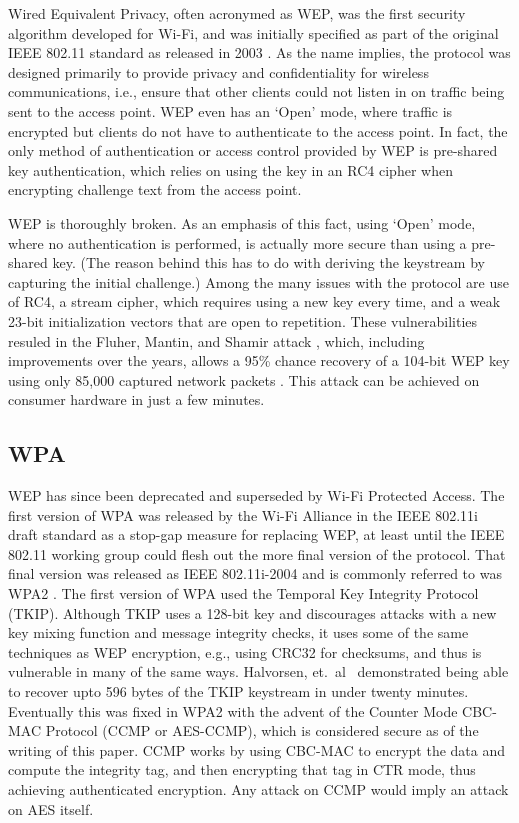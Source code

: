 \documentclass[journal, compsoc]{IEEEtran}
\begin{document}
Wired Equivalent Privacy, often acronymed as WEP, was the first
security algorithm developed for Wi-Fi, and was initially specified as
part of the original IEEE 802.11 standard as released in 2003
\cite{1438730}. As the name implies, the protocol was designed
primarily to provide privacy and confidentiality for wireless
communications, i.e., ensure that other clients could not listen in on
traffic being sent to the access point. WEP even has an `Open' mode,
where traffic is encrypted but clients do not have to authenticate to
the access point. In fact, the only method of authentication or access
control provided by WEP is pre-shared key authentication, which relies
on using the key in an RC4 cipher when encrypting challenge text from
the access point.

WEP is thoroughly broken. As an emphasis of this fact, using `Open'
mode, where no authentication is performed, is actually more secure
than using a pre-shared key. (The reason behind this has to do with
deriving the keystream by capturing the initial challenge.) Among the
many issues with the protocol are use of RC4, a stream cipher, which
requires using a new key every time, and a weak 23-bit initialization
vectors that are open to repetition. These vulnerabilities resuled in
the Fluher, Mantin, and Shamir attack
\cite{Fluhrer:2001:WKS:646557.694759}, which, including improvements
over the years, allows a 95\% chance recovery of a 104-bit WEP key
using only 85,000 captured network packets
\cite{Tews:2007:BBW:1784964.1784983}. This attack can be achieved on
consumer hardware in just a few minutes.

\subsection{WPA}
\label{sec:overview-wpa}

WEP has since been deprecated and superseded by Wi-Fi Protected
Access. The first version of WPA was released by the Wi-Fi Alliance in
the IEEE 802.11i draft standard as a stop-gap measure for replacing
WEP, at least until the IEEE 802.11 working group could flesh out the
more final version of the protocol. That final version was released as
IEEE 802.11i-2004 and is commonly referred to was WPA2
\cite{4100091}. The first version of WPA used the Temporal Key
Integrity Protocol (TKIP). Although TKIP uses a 128-bit key and
discourages attacks with a new key mixing function and message
integrity checks, it uses some of the same techniques as WEP
encryption, e.g., using CRC32 for checksums, and thus is vulnerable in
many of the same ways. Halvorsen, et.~al~\cite{Halvorsen:2009}
demonstrated being able to recover upto 596 bytes of the TKIP
keystream in under twenty minutes. Eventually this was fixed in WPA2
with the advent of the Counter Mode CBC-MAC Protocol (CCMP or
AES-CCMP), which is considered secure as of the writing of this
paper. CCMP works by using CBC-MAC to encrypt the data and compute the
integrity tag, and then encrypting that tag in CTR mode, thus
achieving authenticated encryption. Any attack on CCMP would imply an
attack on AES itself.
\end{document}
